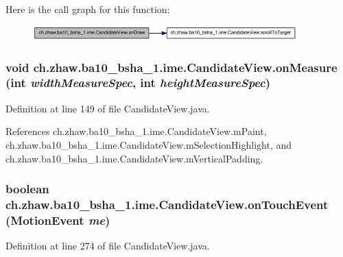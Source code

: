 Here is the call graph for this function:\nopagebreak
\begin{figure}[H]
\begin{center}
\leavevmode
\includegraphics[width=289pt]{classch_1_1zhaw_1_1ba10__bsha__1_1_1ime_1_1CandidateView_a81383d3ca29122604138b340746eabe5_cgraph}
\end{center}
\end{figure}
\hypertarget{classch_1_1zhaw_1_1ba10__bsha__1_1_1ime_1_1CandidateView_ac29e64dd3d1acc11c93208fcffe41f0a}{
\subsubsection[{onMeasure}]{\setlength{\rightskip}{0pt plus 5cm}void ch.zhaw.ba10\_\-bsha\_\-1.ime.CandidateView.onMeasure (int {\em widthMeasureSpec}, \/  int {\em heightMeasureSpec})}}
\label{classch_1_1zhaw_1_1ba10__bsha__1_1_1ime_1_1CandidateView_ac29e64dd3d1acc11c93208fcffe41f0a}


Definition at line 149 of file CandidateView.java.

References ch.zhaw.ba10\_\-bsha\_\-1.ime.CandidateView.mPaint, ch.zhaw.ba10\_\-bsha\_\-1.ime.CandidateView.mSelectionHighlight, and ch.zhaw.ba10\_\-bsha\_\-1.ime.CandidateView.mVerticalPadding.\hypertarget{classch_1_1zhaw_1_1ba10__bsha__1_1_1ime_1_1CandidateView_a726242422f3279f05a81283406fa9d4a}{
\subsubsection[{onTouchEvent}]{\setlength{\rightskip}{0pt plus 5cm}boolean ch.zhaw.ba10\_\-bsha\_\-1.ime.CandidateView.onTouchEvent (MotionEvent {\em me})}}
\label{classch_1_1zhaw_1_1ba10__bsha__1_1_1ime_1_1CandidateView_a726242422f3279f05a81283406fa9d4a}


Definition at line 274 of file CandidateView.java.

